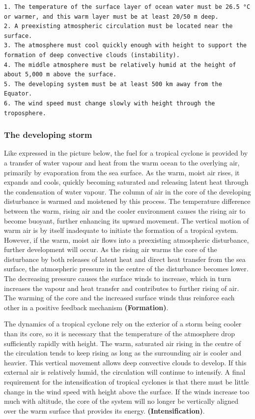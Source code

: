 \documentclass[12pt,oneside]{book}
\begin{document}
\begin{verbatim}
1. The temperature of the surface layer of ocean water must be 26.5 °C or warmer, and this warm layer must be at least 20/50 m deep. 
2. A preexisting atmospheric circulation must be located near the surface.
3. The atmosphere must cool quickly enough with height to support the formation of deep convective clouds (instability).
4. The middle atmosphere must be relatively humid at the height of about 5,000 m above the surface.
5. The developing system must be at least 500 km away from the Equator.
6. The wind speed must change slowly with height through the troposphere.
\end{verbatim}

\subsubsection{The developing storm}\label{the-developing-storm}

Like expressed in the picture below, the fuel for a tropical cyclone is
provided by a transfer of water vapour and heat from the warm ocean to
the overlying air, primarily by evaporation from the sea surface. As the
warm, moist air rises, it expands and cools, quickly becoming saturated
and releasing latent heat through the condensation of water vapour. The
column of air in the core of the developing disturbance is warmed and
moistened by this process. The temperature difference between the warm,
rising air and the cooler environment causes the rising air to become
buoyant, further enhancing its upward movement. The vertical motion of
warm air is by itself inadequate to initiate the formation of a tropical
system. However, if the warm, moist air flows into a preexisting
atmospheric disturbance, further development will occur. As the rising
air warms the core of the disturbance by both releases of latent heat
and direct heat transfer from the sea surface, the atmospheric pressure
in the centre of the disturbance becomes lower. The decreasing pressure
causes the surface winds to increase, which in turn increases the vapour
and heat transfer and contributes to further rising of air. The warming
of the core and the increased surface winds thus reinforce each other in
a positive feedback mechanism \textbf{(Formation)}.

The dynamics of a tropical cyclone rely on the exterior of a storm being
cooler than its core, so it is necessary that the temperature of the
atmosphere drop sufficiently rapidly with height. The warm, saturated
air rising in the centre of the circulation tends to keep rising as long
as the surrounding air is cooler and heavier. This vertical movement
allows deep convective clouds to develop. If this external air is
relatively humid, the circulation will continue to intensify. A final
requirement for the intensification of tropical cyclones is that there
must be little change in the wind speed with height above the surface.
If the winds increase too much with altitude, the core of the system
will no longer be vertically aligned over the warm surface that provides
its energy. \textbf{(Intensification)}.
\end{document}
